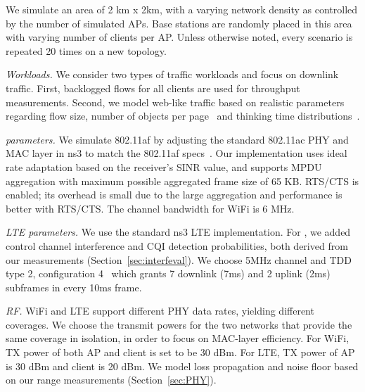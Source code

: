 We simulate an area of 2 km x 2km, with a varying network density as controlled by the number of simulated APs. 
Base stations are randomly placed in this area with varying number of clients per AP. 
Unless otherwise noted, every scenario is repeated 20 times on a new topology. 

{\em Workloads.} We consider two types of traffic workloads and focus on downlink traffic. 
First, backlogged flows for all clients are used for throughput measurements. Second, 
we model web-like traffic based on realistic parameters regarding flow size, 
number of objects per page~\cite{trafficmodel} and thinking time distributions~\cite{thinktime}. 



{\em \wf parameters.} We simulate 802.11af by adjusting the standard 802.11ac PHY and MAC layer in ns3 to match the 802.11af specs~\cite{Rice_af}. 
Our \wf implementation uses ideal rate adaptation based on the 
receiver's SINR value, and supports MPDU aggregation with maximum possible aggregated frame size of 65 KB. 
RTS/CTS is enabled; its overhead is small due to the large aggregation and \wf performance is better with RTS/CTS.
The channel bandwidth for WiFi is 6 MHz.

{\em LTE parameters.} We use the standard ns3 LTE implementation. For \cf, we added 
control channel interference and CQI detection probabilities, both derived from our measurements (Section~\ref{sec:interfeval}).
We choose 5MHz channel and TDD type 2, configuration 4~\cite{36_211} which grants 7 downlink (7ms) and 2 uplink (2ms) subframes in every 10ms frame.


{\em RF.} WiFi and LTE support different PHY data rates, yielding different coverages. 
We choose the transmit powers for the two networks that provide the same coverage in isolation, 
in order to focus on MAC-layer efficiency.
For WiFi, TX power of both AP and client is set to be 30 dBm. For LTE, TX power of AP is 30 dBm and client is 20 dBm. 
We model loss propagation and noise floor based on our range measurements (Section~\ref{sec:PHY}).




